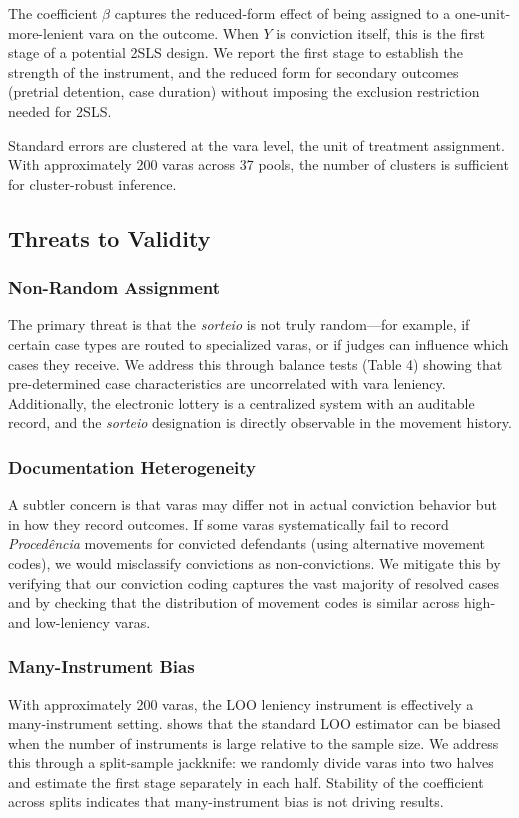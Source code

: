 \documentclass[12pt]{article}
\begin{document}
The coefficient $\beta$ captures the reduced-form effect of being assigned to a one-unit-more-lenient vara on the outcome. When $Y$ is conviction itself, this is the first stage of a potential 2SLS design. We report the first stage to establish the strength of the instrument, and the reduced form for secondary outcomes (pretrial detention, case duration) without imposing the exclusion restriction needed for 2SLS.

Standard errors are clustered at the vara level, the unit of treatment assignment. With approximately 200 varas across 37 pools, the number of clusters is sufficient for cluster-robust inference.

\subsection{Threats to Validity}

\subsubsection*{Non-Random Assignment} The primary threat is that the \textit{sorteio} is not truly random---for example, if certain case types are routed to specialized varas, or if judges can influence which cases they receive. We address this through balance tests (Table 4) showing that pre-determined case characteristics are uncorrelated with vara leniency. Additionally, the electronic lottery is a centralized system with an auditable record, and the \textit{sorteio} designation is directly observable in the movement history.

\subsubsection*{Documentation Heterogeneity} A subtler concern is that varas may differ not in actual conviction behavior but in how they record outcomes. If some varas systematically fail to record \textit{Proced\^encia} movements for convicted defendants (using alternative movement codes), we would misclassify convictions as non-convictions. We mitigate this by verifying that our conviction coding captures the vast majority of resolved cases and by checking that the distribution of movement codes is similar across high- and low-leniency varas.

\subsubsection*{Many-Instrument Bias} With approximately 200 varas, the LOO leniency instrument is effectively a many-instrument setting. \citet{hull2025} shows that the standard LOO estimator can be biased when the number of instruments is large relative to the sample size. We address this through a split-sample jackknife: we randomly divide varas into two halves and estimate the first stage separately in each half. Stability of the coefficient across splits indicates that many-instrument bias is not driving results.
\end{document}
